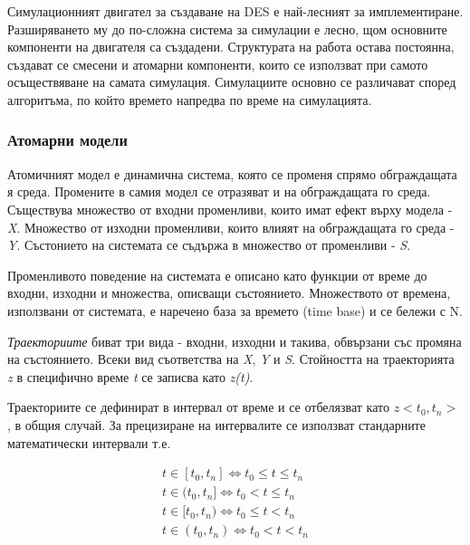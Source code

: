 		Симулационният двигател за създаване на \ac{DES} е най-лесният за имплементиране. Разширяването му
		до по-сложна система за симулации е лесно, щом основните компоненти на двигателя са създадени.
		Структурата на работа остава постоянна, създават се смесени и атомарни компоненти, които се
		използват при самото осъществяване на самата симулация. Симулациите основно се различават според
		алгоритъма, по който времето напредва по време на симулацията.
		
		\subsubsection{Атомарни модели}
			
			Атомичният модел е динамична система, която се променя спрямо обграждащата я среда.
			Промените в самия модел се отразяват и на обграждащата го среда. Съществува
			множество от входни променливи, които имат ефект върху модела - \emph{X}. Множество от изходни променливи, 
			които влияят на обграждащата го среда - \emph{Y}. Състонието на системата се съдържа в множество
			от променливи - \emph{S}.
			
			Променливото поведение на системата е описано като функции от време до входни, изходни и множества, описващи
			състоянието. Множеството от времена, използвани от системата, е наречено база за времето (time base) и се бележи с N.
			
			\emph{Траекториите} биват три вида - входни, изходни и такива, обвързани със промяна на състоянието.
			Всеки вид съответства на \emph{X}, \emph{Y} и \emph{S}. Стойността на траекторията \emph{z} в специфично време \emph{t} се записва
			като \emph{z(t)}.
			
			Траекториите се дефинират в интервал от време и се отбелязват като $z<t_0, t_n>$ , в общия случай. За прецизиране
			на интервалите се използват стандарните математически интервали т.е.
			
			\begin{equation}
			\begin{split}
				t \in [t_0, t_n] \Longleftrightarrow t_0 \le t \le t_n\\
				t \in (t_0, t_n] \Longleftrightarrow t_0 < t \le t_n\\
				t \in [t_0, t_n) \Longleftrightarrow t_0 \le t < t_n\\
				t \in (t_0, t_n) \Longleftrightarrow t_0 < t < t_n
			\end{split}
			\end{equation}
			
